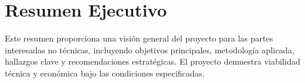 \newpage
\section*{Resumen Ejecutivo}

Este resumen proporciona una visión general del proyecto para las partes interesadas no técnicas, incluyendo objetivos principales, metodología aplicada, hallazgos clave y recomendaciones estratégicas. El proyecto demuestra viabilidad técnica y económica bajo las condiciones especificadas.

\newpage